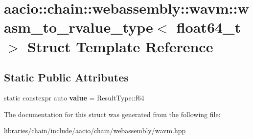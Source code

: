 \hypertarget{structaacio_1_1chain_1_1webassembly_1_1wavm_1_1wasm__to__rvalue__type_3_01float64__t_01_4}{}\section{aacio\+:\+:chain\+:\+:webassembly\+:\+:wavm\+:\+:wasm\+\_\+to\+\_\+rvalue\+\_\+type$<$ float64\+\_\+t $>$ Struct Template Reference}
\label{structaacio_1_1chain_1_1webassembly_1_1wavm_1_1wasm__to__rvalue__type_3_01float64__t_01_4}
\subsection*{Static Public Attributes}
\begin{DoxyCompactItemize}
\item 
\mbox{\label{structaacio_1_1chain_1_1webassembly_1_1wavm_1_1wasm__to__rvalue__type_3_01float64__t_01_4_a44d3014364bf21e83fceb8aa719061d0}} 
static constexpr auto {\bfseries value} = Result\+Type\+::f64
\end{DoxyCompactItemize}


The documentation for this struct was generated from the following file\+:\begin{DoxyCompactItemize}
\item 
libraries/chain/include/aacio/chain/webassembly/wavm.\+hpp\end{DoxyCompactItemize}
